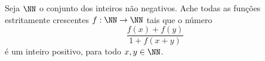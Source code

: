Seja $\NN$ o conjunto dos inteiros não negativos. Ache todas as funções estritamente crescentes $f : \NN \to \NN$ tais que o número \[\frac {f(x) + f(y)}{1 + f(x + y)}\] é um inteiro positivo, para todo $x, y\in\NN$.
